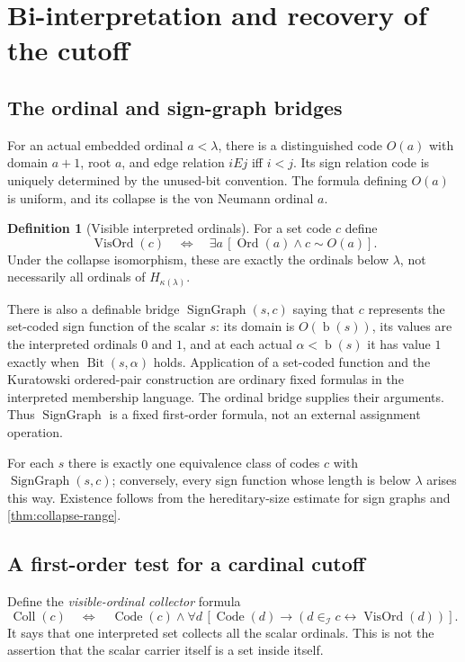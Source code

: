 \documentclass[11pt,letterpaper]{article}
\theoremstyle{definition}
\newtheorem{definition}[theorem]{Definition}
\theoremstyle{remark}
\newcommand{\Ord}{\operatorname{Ord}}
\newcommand{\bd}{\operatorname{b}}
\newcommand{\I}{\mathcal I}
\newcommand{\Code}{\operatorname{Code}}
\newcommand{\Bit}{\operatorname{Bit}}
\newcommand{\Vis}{\operatorname{VisOrd}}
\newcommand{\Coll}{\operatorname{Coll}}
\newcommand{\SG}{\operatorname{SignGraph}}
\begin{document}
\section{Bi-interpretation and recovery of the cutoff}
\label{sec:biinterpretation}

\subsection{The ordinal and sign-graph bridges}

For an actual embedded ordinal $a<\lambda$, there is a distinguished code
$O(a)$ with domain $a+1$, root $a$, and edge relation $iEj$ iff $i<j$.
Its sign relation code is uniquely determined by the unused-bit convention.
The formula defining $O(a)$ is uniform, and its collapse is the
von Neumann ordinal $a$.

\begin{definition}[Visible interpreted ordinals]
For a set code $c$ define
\[
 \Vis(c)\quad\Longleftrightarrow\quad
 \exists a\,[\Ord(a)\land c\sim O(a)].
\]
Under the collapse isomorphism, these are exactly the ordinals below
$\lambda$, not necessarily all ordinals of $H_{\kappa(\lambda)}$.
\end{definition}

There is also a definable bridge $\SG(s,c)$ saying that $c$ represents the
set-coded sign function of the scalar $s$: its domain is $O(\bd(s))$, its
values are the interpreted ordinals $0$ and $1$, and at each actual
$\alpha<\bd(s)$ it has value $1$ exactly when $\Bit(s,\alpha)$ holds.
Application of a set-coded function and the Kuratowski ordered-pair
construction are ordinary fixed formulas in the interpreted membership
language. The ordinal bridge supplies their arguments. Thus $\SG$ is a
fixed first-order formula, not an external assignment operation.

For each $s$ there is exactly one equivalence class of codes $c$ with
$\SG(s,c)$; conversely, every sign function whose length is below $\lambda$
arises this way. Existence follows from the hereditary-size estimate for
sign graphs and \cref{thm:collapse-range}.

\subsection{A first-order test for a cardinal cutoff}

Define the \emph{visible-ordinal collector} formula
\begin{equation}
 \Coll(c)\quad\Longleftrightarrow\quad
 \Code(c)\land
 \forall d\,[\Code(d)\longrightarrow
       (d\in_\I c\leftrightarrow\Vis(d))].
 \label{eq:collector}
\end{equation}
It says that one interpreted set collects all the scalar ordinals. This is
not the assertion that the scalar carrier itself is a set inside itself.
\end{document}
